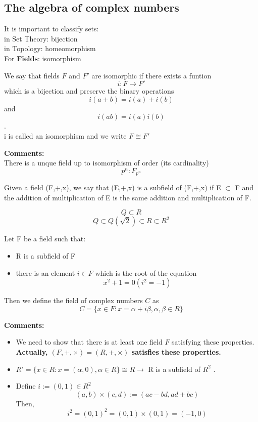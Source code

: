 \subsection{The algebra of complex numbers}
It is important to classify sets:
\\in  Set Theory: bijection
\\in Topology: homeomorphism
\\For \textbf{Fields}: isomorphism
\begin{definition}[isomorphism]{}
   We say that fields $F$ and $F'$ are isomorphic if there exists a funtion $$i:F \rightarrow F'$$ which is a bijection and preserve the binary operations  $$i(a+b)=i(a)+i(b)$$ and $$i(ab)=i(a)i(b)$$.
   \\i is called an isomorphism and we write $F \cong F'$
    \end{definition}
\textbf{Comments:}
\\There is a unque field up to isomorphism of order (its cardinality)$$
    p^n: F_{p^n}
$$ 
\begin{definition}[subfield]{}
Given a field (F,+,x), we say that (E,+,x) is a subfield of (F,+,x) if E $\subset$ F and the addition of multiplication of E is the same addition and multiplication of F. 
\end{definition}
\begin{example}[subfield]{}
$$
    Q \subset R
$$ 
$$
    Q\subset Q(\sqrt{2}) \subset R \subset R^2
$$ 
\end{example}
\begin{definition}{}
Let F be a field such that:\begin{itemize}
\item R is a subfield of F
\item there is an element $i \in F$ which is the root of the equation $$ x^2+1=0 (i^2=-1)$$
\end{itemize}
Then we define the field of complex numbers $ C $ as $$C=\{x\in F:x=\alpha +i\beta ,\alpha, \beta \in R \}$$
\end{definition}
\textbf{Comments:}  
\begin{itemize}
    \item We need to show that there is at least one field $ F $ satisfying these properties.
    \\ \textbf{Actually, $ (F,+,\times) =(R,+,\times)$ satisfies these properties.}
    \item $ R'=\{x\in R:x=(\alpha ,0),\alpha \in R\} \cong R \rightarrow $ R is a subfield of $ R^2 $ .
    \item Define $ i:=(0,1)\in R^2 $ $$
        (a,b)\times (c,d):=(ac-bd,ad+bc) 
    $$  Then, $$
        i^2={(0,1)}^2=(0,1)\times (0,1)=(-1,0)
    $$ 
\end{itemize}
